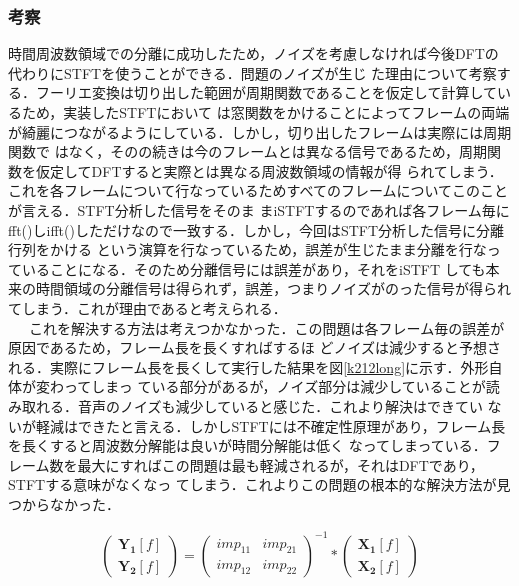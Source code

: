 \documentclass[a4j]{jarticle}
\begin{document}
\subsubsection*{考察}
時間周波数領域での分離に成功したため，ノイズを考慮しなければ今後DFTの代わりにSTFTを使うことができる．問題のノイズが生じ
た理由について考察する．フーリエ変換は切り出した範囲が周期関数であることを仮定して計算しているため，実装したSTFTにおいて
は窓関数をかけることによってフレームの両端が綺麗につながるようにしている．しかし，切り出したフレームは実際には周期関数で
はなく，そのの続きは今のフレームとは異なる信号であるため，周期関数を仮定してDFTすると実際とは異なる周波数領域の情報が得
られてしまう．これを各フレームについて行なっているためすべてのフレームについてこのことが言える．STFT分析した信号をそのま
まiSTFTするのであれば各フレーム毎にfft()しifft()しただけなので一致する．しかし，今回はSTFT分析した信号に分離行列をかける
という演算を行なっているため，誤差が生じたまま分離を行なっていることになる．そのため分離信号には誤差があり，それをiSTFT
しても本来の時間領域の分離信号は得られず，誤差，つまりノイズがのった信号が得られてしまう．これが理由であると考えられる．
\\\ \ \ これを解決する方法は考えつかなかった．この問題は各フレーム毎の誤差が原因であるため，フレーム長を長くすればするほ
どノイズは減少すると予想される．実際にフレーム長を長くして実行した結果を図\ref{k212long}に示す．外形自体が変わってしまっ
ている部分があるが，ノイズ部分は減少していることが読み取れる．音声のノイズも減少していると感じた．これより解決はできてい
ないが軽減はできたと言える．しかしSTFTには不確定性原理があり，フレーム長を長くすると周波数分解能は良いが時間分解能は低く
なってしまっている．フレーム数を最大にすればこの問題は最も軽減されるが，それはDFTであり，STFTする意味がなくなっ
てしまう．これよりこの問題の根本的な解決方法が見つからなかった．

\begin{eqnarray}
 \left(
 \begin{array}{cc}
  \bm{Y_1}[f]\\
  \bm{Y_2}[f]
 \end{array}
\right)
=
\left(
 \begin{array}{cc}
  imp_{11} & imp_{21}\\
  imp_{12} & imp_{22}
 \end{array}
\right)^{-1}
*
\left(
 \begin{array}{cc}
  \bm{X_1}[f]\\
  \bm{X_2}[f]
 \end{array}
\right)
\end{eqnarray}
\end{document}
